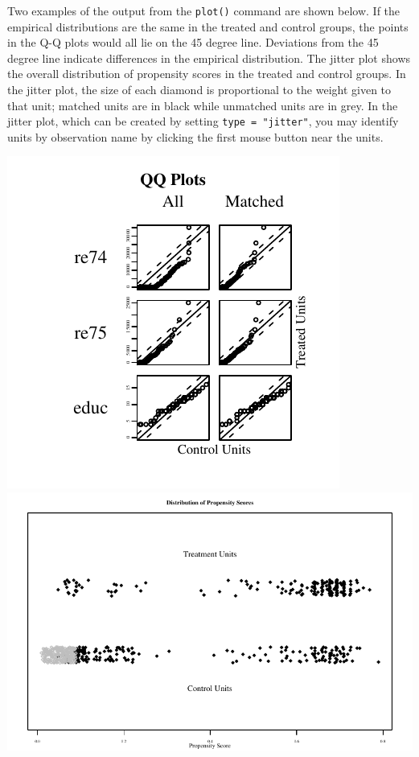
Two examples of the output from the {\tt plot()} command are shown
below.  If the empirical distributions are the same in the treated and
control groups, the points in the Q-Q plots would all lie on the 45 degree line.
Deviations from the 45 degree line indicate differences in the
empirical distribution.  The jitter plot shows the overall
distribution of propensity scores in the treated and control groups.
In the jitter plot, the size of each diamond is proportional to the
weight given to that unit; matched units are in black while unmatched
units are in grey. In the jitter
plot, which can be created by setting \texttt{type = "jitter"}, you
may identify units by observation name by clicking the first mouse
button near the units. 


\hspace{-0.75in}\includegraphics{figs/qqplotnn1}
\includegraphics[scale=0.75]{figs/jitterplotnn}


